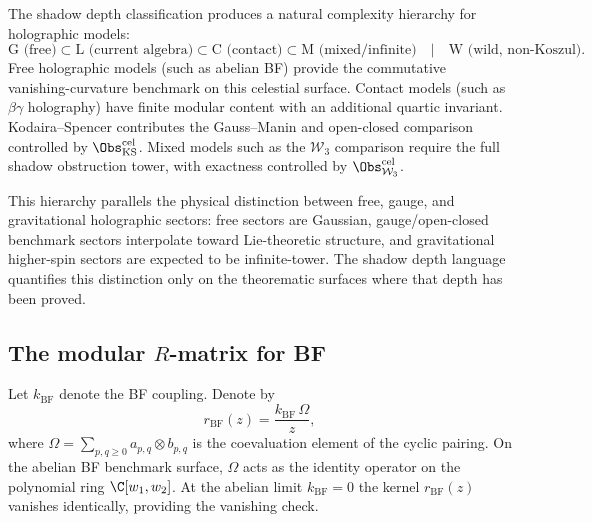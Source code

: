 \begin{remark}
The shadow depth classification produces a natural complexity hierarchy for holographic
models:
\[
\text{G (free)} \subset \text{L (current algebra)} \subset \text{C (contact)}
\subset \text{M (mixed/infinite)}
\quad\bigl|\quad
\text{W (wild, non-Koszul)}.
\]
Free holographic models (such as abelian BF) provide the commutative
vanishing-curvature benchmark on this celestial surface.
Contact models (such as $\beta\gamma$ holography) have finite modular content with an
additional quartic invariant. Kodaira--Spencer contributes the Gauss--Manin
and open-closed comparison controlled by
$\Obs^{\mathrm{cel}}_{\mathrm{KS}}$. Mixed models such as the
$\mathcal{W}_3$ comparison require the full shadow obstruction tower,
with exactness controlled by $\Obs^{\mathrm{cel}}_{\mathcal W_3}$.

This hierarchy parallels the physical distinction between free, gauge, and
gravitational holographic sectors: free sectors are Gaussian, gauge/open-closed
benchmark sectors interpolate toward Lie-theoretic structure, and gravitational
higher-spin sectors are expected to be infinite-tower. The shadow depth language
quantifies this distinction only on the theorematic surfaces where that depth has
been proved.
\end{remark}

\subsection{The modular $R$-matrix for BF}

\begin{definition}
Let $k_{\mathrm{BF}}$ denote the BF coupling. Denote by
\begin{equation}
r_{\mathrm{BF}}(z) = \frac{k_{\mathrm{BF}}\,\Omega}{z},
\end{equation}
where $\Omega = \sum_{p,q \geq 0} a_{p,q} \otimes b_{p,q}$ is the coevaluation
element of the cyclic pairing. On the abelian BF benchmark surface, $\Omega$
acts as the identity operator on the polynomial ring $\C[w_1, w_2]$. At the
abelian limit $k_{\mathrm{BF}} = 0$ the kernel $r_{\mathrm{BF}}(z)$ vanishes
identically, providing the vanishing check.
\end{definition}

